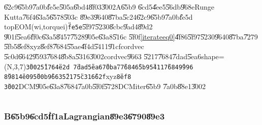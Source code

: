 \U{62c9}\U{65b9}\U{7a0b}\U{fe5e}\U{505a}\U{6bd4}\U{8f03}\U{3002}A\U{65b9}%
\U{6cd5}\U{4ee5}\U{56db}\U{968e}Runge Kutta\U{76f4}\U{63a5}\U{6578}\U{503c}%
\U{89e3}\U{9640}\U{87ba}\U{5c24}\U{62c9}\U{65b9}\U{7a0b}\U{fe5d}%
topEOM(wi,torquei)\texttt{\U{fe5e}}\U{5f97}\U{5230}\U{8cbc}\U{9ad4}\U{89d2}%
\U{901f}\U{5ea6}\U{ff0c}\U{63a5}\U{8457}\U{7528}\U{905e}\U{63a8}\U{516c}%
\U{5f0f}\ref{iterateeq0}\U{4f86}\U{5f97}\U{5230}\U{9640}\U{87ba}\U{7279}%
\U{5fb5}\U{8ef8}xyz\U{8ef8}\U{7684}\U{55ae}\U{4f4d}\U{5411}\U{91cf}cordvec%
\U{5c0d}\U{6642}\U{9593}\U{7684}\U{8b8a}\U{5316}\U{3002}cordvec\U{9663}%
\U{5217}\U{7684}\U{7dad}\U{5ea6}shape=(N,3,7)\texttt{\U{3002}\U{5176}\U{4e2d}%
\U{7dad}\U{5ea6}\U{70ba}}7\texttt{\U{7684}\U{65b9}\U{5411}\U{7684}\U{9996}%
\U{8981}\U{4e09}\U{500b}\U{9663}\U{5217}\U{5c31}\U{662f}}xyz\texttt{\U{8ef8}%
\U{3002}}DCM\U{905e}\U{63a8}\U{7684}\U{7a0b}\U{5f0f}\U{5728}DCMiter\U{65b9}%
\U{7a0b}\U{88e1}\U{3002}

\begin{mdframed}[leftline=false, rightline=false,backgroundcolor=bg]
\inputminted[linenos,fontsize=\footnotesize,gobble=12,breaklines,breakanywhere,firstline=287,lastline=297]{python}{../../Scripts/cordtrans/Physics_and_Animation_Modules_Library/RGCordTransV15.py}
\end{mdframed}

\subsubsection{B\U{65b9}\U{6cd5}\U{ff1a}Lagrangian\U{89e3}\U{6790}\U{89e3}}

